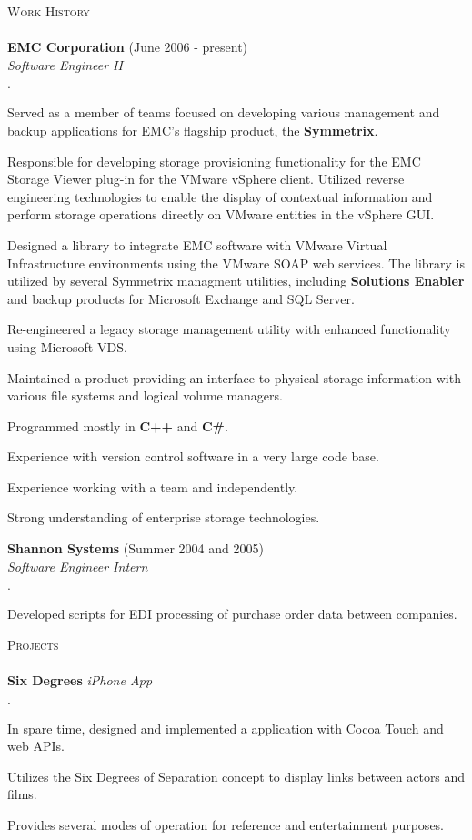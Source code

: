 \documentclass[11pt]{article}
\newcommand{\mydot}{$\cdot$ }
\newcommand{\lineunder}{\vspace*{-8pt} \\ \hspace*{-18pt} \hrulefill \\}
\newcommand{\header}[1]{{\hspace*{-15pt}\vspace*{6pt} \textsc{#1}} \vspace*{-6pt} \lineunder}
\newcommand{\employer}[3]{\textbf{#1} (#2)\\ \emph{#3}\\  }
\newcommand{\project}[2]{\textbf{#1} \emph{#2}\\  }
\newenvironment{achievements}{\begin{list}{\mydot}{\topsep 0pt \itemsep -2pt}}{\vspace*{4pt}\end{list}}
\begin{document}
\header{Work History}
\employer{EMC Corporation}{June 2006 - present}{Software Engineer II}
\begin{achievements}
  \item Served as a member of teams focused on developing various management and backup applications for EMC's flagship product, the \textbf{Symmetrix}.
  \item Responsible for developing storage provisioning functionality for the EMC Storage Viewer plug-in for the VMware vSphere client.  Utilized reverse engineering technologies to enable the display of contextual information and perform storage operations directly on VMware entities in the vSphere GUI.
  \item Designed a library to integrate EMC software with VMware Virtual Infrastructure environments using the VMware SOAP web services.  The library is utilized by several Symmetrix managment utilities, including \textbf{Solutions Enabler} and backup products for Microsoft Exchange and SQL Server.
  \item Re-engineered a legacy storage management utility with enhanced functionality using Microsoft VDS.
  \item Maintained a product providing an interface to physical storage information with various file systems and logical volume managers.
  \item Programmed mostly in \textbf{C++} and \textbf{C\#}.
  \item Experience with version control software in a very large code base.
  \item Experience working with a team and independently.
  \item Strong understanding of enterprise storage technologies.
\end{achievements}

\employer{Shannon Systems}{Summer 2004 and 2005}{Software Engineer Intern}
\begin{achievements}
  \item Developed scripts for EDI processing of purchase order data between companies.
\end{achievements}


\header{Projects}
\project{Six Degrees}{iPhone App}{
\begin{achievements}
  \item In spare time, designed and implemented a application with Cocoa Touch and web APIs.
  \item Utilizes the Six Degrees of Separation concept to display links between actors and films.
  \item Provides several modes of operation for reference and entertainment purposes.
\end{achievements}}
\end{document}

